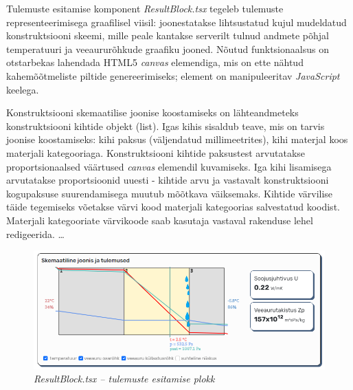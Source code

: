 Tulemuste esitamise komponent \textit{ResultBlock.tsx} tegeleb tulemuste representeerimisega graafilisel viisil: joonestatakse lihtsustatud kujul mudeldatud konstruktsiooni skeemi, 
mille peale kantakse serverilt tulnud andmete põhjal temperatuuri ja veeaururõhkude graafiku jooned. Nõutud funktsionaalsus on otstarbekas lahendada HTML5 \textit{canvas} elemendiga, mis
on ette nähtud kahemõõtmeliste piltide genereerimiseks; element on manipuleeritav \textit{JavaScript} keelega. 

Konstruktsiooni skemaatilise joonise koostamiseks on lähteandmeteks konstruktsiooni kihtide objekt (list). Igas kihis sisaldub teave, mis on tarvis joonise koostamiseks: 
kihi paksus (väljendatud millimeetrites), kihi materjal koos materjali kategooriaga. 
Konstruktsiooni kihtide paksustest arvutatakse proportsionaalsed väärtused \textit{canvas} elemendil kuvamiseks. Iga kihi lisamisega arvutatakse proportsioonid uuesti - kihtide arvu
ja vastavalt konstruktsiooni kogupaksuse suurendamisega muutub mõõtkava väiksemaks. Kihtide värvilise täide tegemiseks võetakse värvi kood materjali kategoorias salvestatud koodist.
Materjali kategooriate värvikoode saab kasutaja vastaval rakenduse lehel redigeerida. 
\dots

\begin{figure}[ht]
    \centering
    \includegraphics[width=1\textwidth]{figures/development/frontennd_resultblock.png}
    \caption[ResultBlock.tsx -- tulemuste esitamise plokk]{\textit{ResultBlock.tsx -- tulemuste esitamise plokk}}
    \label{fig:development_frontend_results}
\end{figure}


